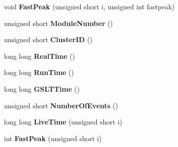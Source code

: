 \begin{DoxyCompactItemize}
void {\bfseries Fast\+Peak} (unsigned short i, unsigned int fastpeak)
\item 
\mbox{\label{class_dgf_scaler_sub_event_a913e196c9dd4829d8bea5db881e240f7}} 
unsigned short {\bfseries Module\+Number} ()
\item 
\mbox{\label{class_dgf_scaler_sub_event_ad481d1073428e20f69f7bb8d099b3bed}} 
unsigned short {\bfseries Cluster\+ID} ()
\item 
\mbox{\label{class_dgf_scaler_sub_event_a7b9076a625781dd2e3456e910c2c3239}} 
long long {\bfseries Real\+Time} ()
\item 
\mbox{\label{class_dgf_scaler_sub_event_aeb5d3d6d053b49df431e5544ddeacdba}} 
long long {\bfseries Run\+Time} ()
\item 
\mbox{\label{class_dgf_scaler_sub_event_a7684a4958881cff43c94835e34658f3b}} 
long long {\bfseries G\+S\+L\+T\+Time} ()
\item 
\mbox{\label{class_dgf_scaler_sub_event_abba61fa31c82f03fcbddaaaf2e8360cc}} 
unsigned short {\bfseries Number\+Of\+Events} ()
\item 
\mbox{\label{class_dgf_scaler_sub_event_a1a3b59c0babb769e553008f0d1ff3af6}} 
long long {\bfseries Live\+Time} (unsigned short i)
\item 
\mbox{\label{class_dgf_scaler_sub_event_a2d086ff6df7007e8eb1c645e9ddb5f85}} 
int {\bfseries Fast\+Peak} (unsigned short i)
\end{DoxyCompactItemize}
